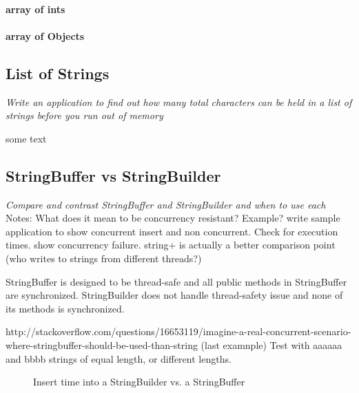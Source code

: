 \documentclass[fleqn,10pt]{SelfArx} %
\begin{document}
\paragraph{array of ints}
\paragraph{array of Objects}


\subsection{List of Strings}
\textit{Write an application to find out how many total characters can be held in a list of strings before you run out of memory}

some text



\subsection{StringBuffer vs StringBuilder}
\textit{Compare and contrast StringBuffer and StringBuilder and when to use each}
Notes: What does it mean to be concurrency resistant? Example? write sample application to show concurrent insert and non concurrent. Check for execution times. show concurrency failure. string+ is actually a better comparison point (who writes to strings from different threads?)

StringBuffer is designed to be thread-safe and all public methods in StringBuffer are synchronized. StringBuilder does not handle thread-safety issue and none of its methods is synchronized.

http://stackoverflow.com/questions/16653119/imagine-a-real-concurrent-scenario-where-stringbuffer-should-be-used-than-string (last examnple) Test with aaaaaa and bbbb strings of equal length, or different lengths.


\begin{figure}[H]\centering
{}\caption{Insert time into a StringBuilder vs. a StringBuffer}
\label{fig:stringbuildervsStringBuffer}
\end{figure}
\end{document}
